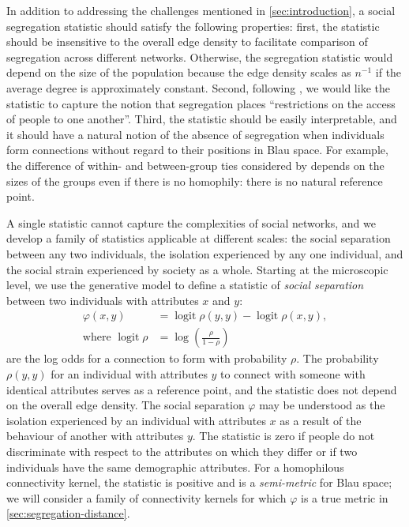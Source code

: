\documentclass{scrartcl}
\DeclareMathOperator{\logit}{logit}
\begin{document}
In addition to addressing the challenges mentioned in \cref{sec:introduction}, a social segregation statistic should satisfy the following properties: first, the statistic should be insensitive to the overall edge density to facilitate comparison of segregation across different networks. Otherwise, the segregation statistic would depend on the size of the population because the edge density scales as $n^{-1}$ if the average degree is approximately constant. Second, following \textcite{Freeman1978}, we would like the statistic to capture the notion that segregation places ``restrictions on the access of people to one another''. Third, the statistic should be easily interpretable, and it should have a natural notion of the absence of segregation when individuals form connections without regard to their positions in Blau space. For example, the difference of within- and between-group ties considered by \textcite{Krackhardt1988} depends on the sizes of the groups even if there is no homophily: there is no natural reference point.

A single statistic cannot capture the complexities of social networks, and we develop a family of statistics applicable at different scales: the social separation between any two individuals, the isolation experienced by any one individual, and the social strain experienced by society as a whole. Starting at the microscopic level, we use the generative model to define a statistic of \emph{social separation} between two individuals with attributes $x$ and $y$:
\begin{align}
    \varphi(x, y) &= \logit \rho(y,y) - \logit\rho(x,y),\label{eq:social-separation}\\
    \text{where }\logit\rho &= \log\left(\frac{\rho}{1-\rho}\right)\nonumber
\end{align}
are the log odds for a connection to form with probability $\rho$. The probability $\rho(y, y)$ for an individual with attributes $y$ to connect with someone with identical attributes serves as a reference point, and the statistic does not depend on the overall edge density. The social separation $\varphi$ may be understood as the isolation experienced by an individual with attributes $x$ as a result of the behaviour of another with attributes $y$. The statistic is zero if people do not discriminate with respect to the attributes on which they differ or if two individuals have the same demographic attributes. For a homophilous connectivity kernel, the statistic is positive and is a \emph{semi-metric} for Blau space; we will consider a family of connectivity kernels for which $\varphi$ is a true metric in \cref{sec:segregation-distance}.
\end{document}

